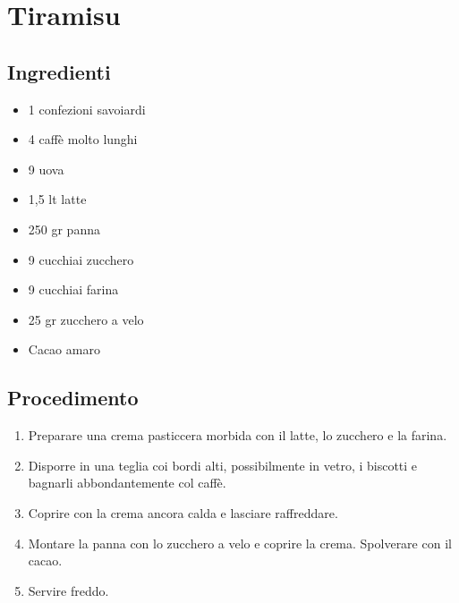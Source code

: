 \section{Tiramisu}
\subsection{Ingredienti}
\begin{itemize}
\item 1 confezioni savoiardi  
\item 4 caffè molto lunghi  
\item 9 uova  
\item 1,5 lt latte  
\item 250 gr panna  
\item 9 cucchiai zucchero  
\item 9 cucchiai farina  
\item 25 gr zucchero a velo  
\item Cacao amaro
\end{itemize}
\subsection{Procedimento}
\begin{enumerate}
\item  Preparare una crema pasticcera morbida con il latte, lo zucchero e la farina.  
\item  Disporre in una teglia coi bordi alti, possibilmente in vetro, i biscotti e bagnarli abbondantemente col caffè.  
\item  Coprire con la crema ancora calda e lasciare raffreddare.  
\item  Montare la panna con lo zucchero a velo e coprire la crema. Spolverare con il cacao.  
\item  Servire freddo.
\end{enumerate}
